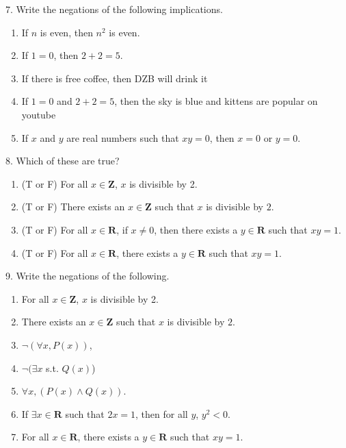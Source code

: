 \documentclass[12pt, reqno]{amsart}
\begin{document}
7. Write the negations of the following implications.
\vspace{10pt}
\begin{enumerate}
\item If $n$ is even, then $n^2$ is even.
\item If $1 = 0$, then $2 + 2 = 5$.
\item If there is free coffee, then DZB will drink it
\item If $1 = 0$ and $2 + 2 = 5$, then the sky is blue and kittens are popular on youtube
\item If $x$ and $y$ are real numbers such that $xy = 0$, then $x = 0$ or $y = 0$.
\end{enumerate}
\vspace{20pt}

8. Which of these are true? 
\vspace{10pt}
\begin{enumerate}
\item (T or F) For all $x \in \mathbf{Z}$, $x$ is divisible by 2.
\item (T or F) There exists an $x \in \mathbf{Z}$ such that $x$ is divisible by $2$.
\item (T or F) For all $x \in \mathbf{R}$, if $x \neq 0$, then there exists a $y \in \mathbf{R}$ such that $xy = 1$.
\item (T or F) For all $x \in \mathbf{R}$, there exists a $y \in \mathbf{R}$ such that $xy = 1$.
\end{enumerate}
\vspace{20pt}

9. Write the negations of the following.
\vspace{10pt}
\begin{enumerate}
\item For all $x \in \mathbf{Z}$, $x$ is divisible by 2.
\item There exists an $x \in \mathbf{Z}$ such that $x$ is divisible by $2$.
\item $\neg(\forall x, P(x))$,
\item $\neg( \exists x $ s.t. $Q(x)$)
\item $\forall x, (P(x) \wedge Q(x))$.
\item If $\exists x \in \mathbf{R}$ such that $2x = 1$, then for all $y$, $y^2 < 0$.  
\item For all $x \in \mathbf{R}$, there exists a $y \in \mathbf{R}$ such that $xy = 1$.
\end{enumerate}
\vspace{20pt}
\end{document}
